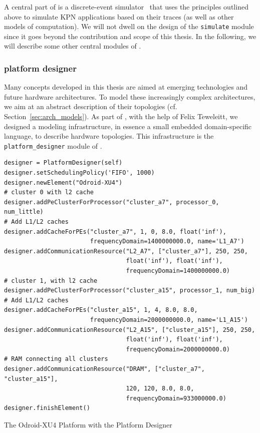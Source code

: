 A central part of \mocasin is a discrete-event simulator~\cite{menard_norcas16} that uses the principles outlined above to simulate KPN applications based on their traces (as well as other models of computation).
We will not dwell on the design of the \texttt{simulate} module since it goes beyond the contribution and scope of this thesis.
In the following, we will describe some other central modules of \mocasin. 


\subsubsection{platform designer}

Many concepts developed in this thesis are aimed at emerging technologies and future hardware architectures.
To model these increasingly complex architectures, we aim at an abstract description of their topologies (cf. Section~\ref{sec:arch_models}).
As part of \mocasin, with the help of Felix Teweleitt, we designed a modeling infrastructure, in essence a small embedded domain-specific language, to describe hardware topologies.
This infrastructure is the \texttt{platform\_designer} module of \mocasin.

\begin{listing}
\begin{verbatim}
designer = PlatformDesigner(self)
designer.setSchedulingPolicy('FIFO', 1000)
designer.newElement("Odroid-XU4")
# cluster 0 with l2 cache
designer.addPeClusterForProcessor("cluster_a7", processor_0, num_little)
# Add L1/L2 caches
designer.addCacheForPEs("cluster_a7", 1, 0, 8.0, float('inf'),
                        frequencyDomain=1400000000.0, name='L1_A7')
designer.addCommunicationResource("L2_A7", ["cluster_a7"], 250, 250,
                                  float('inf'), float('inf'),
                                  frequencyDomain=1400000000.0)
# cluster 1, with l2 cache
designer.addPeClusterForProcessor("cluster_a15", processor_1, num_big)
# Add L1/L2 caches
designer.addCacheForPEs("cluster_a15", 1, 4, 8.0, 8.0,
                        frequencyDomain=2000000000.0, name='L1_A15')
designer.addCommunicationResource("L2_A15", ["cluster_a15"], 250, 250,
                                  float('inf'), float('inf'),
                                  frequencyDomain=2000000000.0)
# RAM connecting all clusters
designer.addCommunicationResource("DRAM", ["cluster_a7", "cluster_a15"],
                                  120, 120, 8.0, 8.0,
                                  frequencyDomain=933000000.0)
designer.finishElement()
\end{verbatim}
\caption{The Odroid-XU4 Platform with the Platform Designer}
\label{listing:designer_odroid}
\end{listing}

